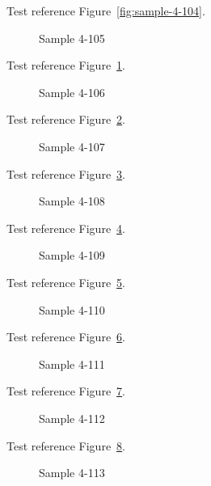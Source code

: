 Test reference Figure~\ref{fig:sample-4-104}.

\begin{figure}[tbhp]
\caption{Sample 4-105}
\label{fig:sample-4-105}
\end{figure}

Test reference Figure~\ref{fig:sample-4-105}.

\begin{figure}[tbhp]
\caption{Sample 4-106}
\label{fig:sample-4-106}
\end{figure}

Test reference Figure~\ref{fig:sample-4-106}.

\begin{figure}[tbhp]
\caption{Sample 4-107}
\label{fig:sample-4-107}
\end{figure}

Test reference Figure~\ref{fig:sample-4-107}.

\begin{figure}[tbhp]
\caption{Sample 4-108}
\label{fig:sample-4-108}
\end{figure}

Test reference Figure~\ref{fig:sample-4-108}.

\begin{figure}[tbhp]
\caption{Sample 4-109}
\label{fig:sample-4-109}
\end{figure}

Test reference Figure~\ref{fig:sample-4-109}.

\begin{figure}[tbhp]
\caption{Sample 4-110}
\label{fig:sample-4-110}
\end{figure}

Test reference Figure~\ref{fig:sample-4-110}.

\begin{figure}[tbhp]
\caption{Sample 4-111}
\label{fig:sample-4-111}
\end{figure}

Test reference Figure~\ref{fig:sample-4-111}.

\begin{figure}[tbhp]
\caption{Sample 4-112}
\label{fig:sample-4-112}
\end{figure}

Test reference Figure~\ref{fig:sample-4-112}.

\begin{figure}[tbhp]
\caption{Sample 4-113}
\label{fig:sample-4-113}
\end{figure}

